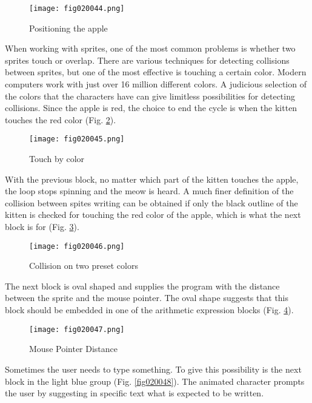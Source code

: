 \begin{figure}[H]
   \centering
   \texttt{[image: fig020044.png]}
   \caption{Positioning the apple}
\label{fig020044}
\end{figure}

When working with sprites, one of the most common problems is whether two sprites touch or overlap. There are various techniques for detecting collisions between sprites, but one of the most effective is touching a certain color. Modern computers work with just over 16 million different colors. A judicious selection of the colors that the characters have can give limitless possibilities for detecting collisions. Since the apple is red, the choice to end the cycle is when the kitten touches the red color (Fig. \ref{fig020045}).

\begin{figure}[H]
   \centering
   \texttt{[image: fig020045.png]}
   \caption{Touch by color}
\label{fig020045}
\end{figure}

With the previous block, no matter which part of the kitten touches the apple, the loop stops spinning and the meow is heard. A much finer definition of the collision between spites writing can be obtained if only the black outline of the kitten is checked for touching the red color of the apple, which is what the next block is for (Fig. \ref{fig020046}).

\begin{figure}[H]
   \centering
   \texttt{[image: fig020046.png]}
   \caption{Collision on two preset colors}
\label{fig020046}
\end{figure}

The next block is oval shaped and supplies the program with the distance between the sprite and the mouse pointer. The oval shape suggests that this block should be embedded in one of the arithmetic expression blocks (Fig. \ref{fig020047}).

\begin{figure}[H]
   \centering
   \texttt{[image: fig020047.png]}
   \caption{Mouse Pointer Distance}
\label{fig020047}
\end{figure}

Sometimes the user needs to type something. To give this possibility is the next block in the light blue group (Fig. \ref{fig020048}). The animated character prompts the user by suggesting in specific text what is expected to be written.

